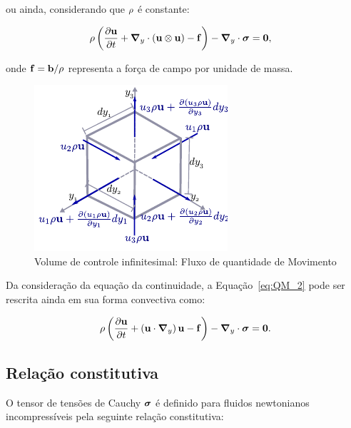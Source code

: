 \noindent ou ainda, considerando que $\rho$ é constante:

\begin{align}
	\rho\left(\frac{\partial\mathbf{u}}{\partial t} + \boldsymbol{\nabla}_y \cdot \left(\mathbf{u}\otimes\mathbf{u}\right) - \mathbf{f} \right) - \boldsymbol{\nabla}_y \cdot \boldsymbol{\sigma}  &= \mathbf{0}, \label{eq:QM_2} 
\end{align}

\noindent onde $\mathbf{f} = \mathbf{b}/\rho$ representa a força de campo por unidade de massa.

\begin{figure}[!htbp]
	\caption{Volume de controle infinitesimal: Fluxo de quantidade de Movimento}
	\begin{center}
	\includegraphics[scale=1.5,trim=0cm 0.0cm 0cm 0.0cm, clip=true]{Imagens/Cap2/volInf_consQtdeMov.pdf}	
	\end{center}
	\label{fig:volInf_consQtdeMov}
\end{figure}

Da consideração da equação da continuidade, a Equação~\eqref{eq:QM_2} pode ser rescrita ainda em sua forma convectiva como:

\begin{align}
	\rho\left(\frac{\partial\mathbf{u}}{\partial t} + \left( \mathbf{u} \cdot \boldsymbol{\nabla}_y \right)  \mathbf{u}  - \mathbf{f} \right) - \boldsymbol{\nabla}_y \cdot \boldsymbol{\sigma} = \mathbf{0}. \label{eq:Navier-Stokes} 
\end{align}

\subsection{Relação constitutiva}

O tensor de tensões de Cauchy $\boldsymbol{\sigma}$ é definido para fluidos newtonianos incompressíveis pela seguinte relação constitutiva:

